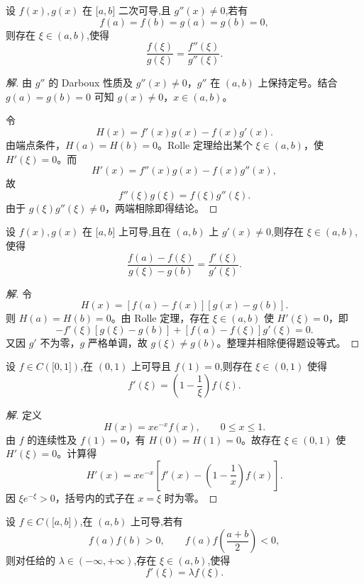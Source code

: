 \documentclass[../../数学分析培优讲义(答案版).tex]{subfiles}
\begin{document}
\begin{example}
设 $f(x),g(x)$ 在 $\lbrack a,b\rbrack$ 二次可导,且 $g''(x)\neq0$,若有
\[
    f(a)=f(b)=g(a)=g(b)=0,
\]
则存在 $\xi\in(a,b)$,使得
\[
    \dfrac{f(\xi)}{g(\xi)}=\dfrac{f''(\xi)}{g''(\xi)}.
\]
\end{example}

\begin{proof}[解]
由 $g''$ 的 Darboux 性质及 $g''(x)\neq0$，$g''$ 在 $(a,b)$ 上保持定号。结合 $g(a)=g(b)=0$ 可知 $g(x)\neq0$，$x\in(a,b)$。

令
\[
    H(x)=f'(x)g(x)-f(x)g'(x).
\]
由端点条件，$H(a)=H(b)=0$。Rolle 定理给出某个 $\xi\in(a,b)$，使 $H'(\xi)=0$。而
\[
    H'(x)=f''(x)g(x)-f(x)g''(x),
\]
故
\[
    f''(\xi)g(\xi)=f(\xi)g''(\xi).
\]
由于 $g(\xi)g''(\xi)\neq0$，两端相除即得结论。
\end{proof}

\begin{example}
设 $f(x),g(x)$ 在 $\lbrack a,b\rbrack$ 上可导,且在 $(a,b)$ 上 $g'(x)\neq0$,则存在 $\xi\in(a,b)$,使得
\[
    \dfrac{f(a)-f(\xi)}{g(\xi)-g(b)}=\dfrac{f'(\xi)}{g'(\xi)}.
\]
\end{example}

\begin{proof}[解]
令
\[
    H(x)=[f(a)-f(x)][g(x)-g(b)].
\]
则 $H(a)=H(b)=0$。由 Rolle 定理，存在 $\xi\in(a,b)$ 使 $H'(\xi)=0$，即
\[
    -f'(\xi)[g(\xi)-g(b)]
    +[f(a)-f(\xi)]g'(\xi)=0.
\]
又因 $g'$ 不为零，$g$ 严格单调，故 $g(\xi)\neq g(b)$。整理并相除便得题设等式。
\end{proof}

\begin{example}
设 $f\in C(\lbrack 0,1\rbrack)$,在 $(0,1)$ 上可导且 $f(1)=0$,则存在 $\xi\in(0,1)$ 使得
\[
    f'(\xi)=\left(1-\dfrac{1}{\xi}\right)f(\xi).
\]
\end{example}

\begin{proof}[解]
定义
\[
    H(x)=xe^{-x}f(x),
    \qquad 0\leq x\leq1.
\]
由 $f$ 的连续性及 $f(1)=0$，有 $H(0)=H(1)=0$。故存在 $\xi\in(0,1)$ 使 $H'(\xi)=0$。计算得
\[
    H'(x)=xe^{-x}\left[f'(x)-\left(1-\dfrac{1}{x}\right)f(x)\right].
\]
因 $\xi e^{-\xi}>0$，括号内的式子在 $x=\xi$ 时为零。
\end{proof}

\begin{example}
设 $f\in C(\lbrack a,b\rbrack)$,在 $(a,b)$ 上可导,若有
\[
    f(a)f(b)>0,
    \qquad
    f(a)f\left(\dfrac{a+b}{2}\right)<0,
\]
则对任给的 $\lambda\in(-\infty,+\infty)$,存在 $\xi\in(a,b)$,使得
\[
    f'(\xi)=\lambda f(\xi).
\]
\end{example}
\end{document}
